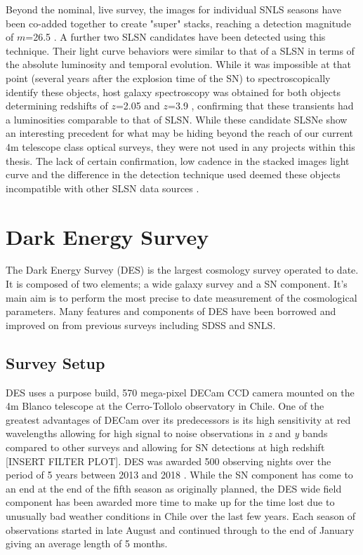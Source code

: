 Beyond the nominal, live survey, the images for individual SNLS seasons have been co-added together to create "super" stacks, reaching a detection magnitude of $m$=26.5 \citep{Cooke2012}. A further two SLSN candidates have been detected using this technique. Their light curve behaviors were similar to that of a SLSN in terms of the absolute luminosity and temporal evolution. While it was impossible at that point (several years after the explosion time of the SN) to spectroscopically identify these objects, host galaxy spectroscopy was obtained for both objects determining redshifts of $z$=2.05 and $z$=3.9 \citep{Cooke2012}, confirming that these transients had a luminosities comparable to that of SLSN. While these candidate SLSNe show an interesting precedent for what may be hiding beyond the reach of our current 4m telescope class optical surveys, they were not used in any projects within this thesis. The lack of certain confirmation, low cadence in the stacked images light curve and the difference in the detection technique used deemed these objects incompatible with other SLSN data sources \citep{Prajs2016}.

\section{Dark Energy Survey}
The Dark Energy Survey (DES) is the largest cosmology survey operated to date. It is composed of two elements; a wide galaxy survey and a SN component. It's main aim is to perform the most precise to date measurement of the cosmological parameters. Many features and components of DES have been borrowed and improved on from previous surveys including SDSS and SNLS.

\subsection{Survey Setup}
DES uses a purpose build, 570 mega-pixel DECam CCD camera \citep{Honscheid2008,Flaugher2015} mounted on the 4m Blanco telescope at the Cerro-Tollolo observatory in Chile. One of the greatest advantages of DECam over its predecessors is its high sensitivity at red wavelengths allowing for high signal to noise observations in \textit{z} and \textit{y} bands compared to other surveys and allowing for SN detections at high redshift [INSERT FILTER PLOT]. DES was awarded 500 observing nights over the period of 5 years between 2013 and 2018 \citep{DES2016}. While the SN component has come to an end at the end of the fifth season as originally planned, the DES wide field component has been awarded more time to make up for the time lost due to unusually bad weather conditions in Chile over the last few years. Each season of observations started in late August and continued through to the end of January giving an average length of 5 months.

